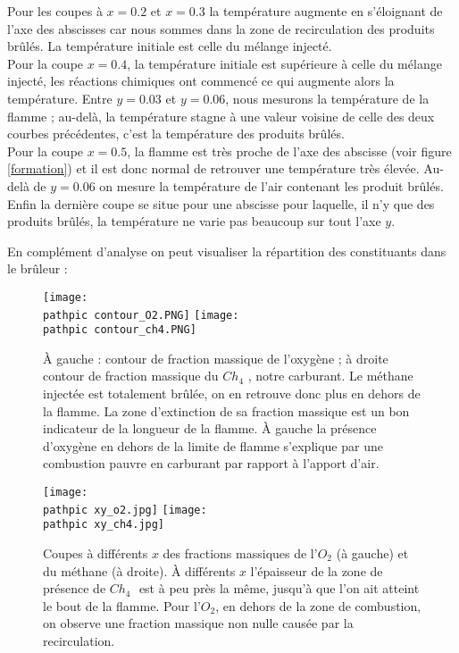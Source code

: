 \documentclass[a4paper,10pt]{article}
\newcommand\pathpic{/home/saura/Documents/Latex_files/Pic/BE_combustion/tp2/}
\newcommand{\chq}{$Ch_4$ }
\begin{document}
\noindent Pour les coupes à $x=0.2$ et $x=0.3$ la température augmente en s'éloignant de l'axe des abscisses car nous sommes dans la zone de recirculation des produits brûlés. La température initiale est celle du mélange injecté.\\
Pour la coupe $x=0.4$, la température initiale est supérieure à celle du mélange injecté, les réactions chimiques ont commencé ce qui augmente alors la température. Entre $y=0.03$ et $y=0.06$, nous mesurons la température de la flamme ; au-delà, la température stagne à une valeur voisine de celle des deux courbes précédentes, c'est la température des produits brûlés.\\
Pour la coupe $x=0.5$, la flamme est très proche de l'axe des abscisse (voir figure \ref{formation}) et il est donc normal de retrouver une température très élevée. Au-delà de $y = 0.06$ on mesure la température de l'air contenant les produit brûlés.\\
Enfin la dernière coupe se situe pour une abscisse pour laquelle, il n'y que des produits brûlés, la température ne varie pas beaucoup sur tout l'axe $y$.

\pagebreak 

\noindent En complément d'analyse on peut visualiser la répartition des constituants dans le brûleur :

\begin{figure}[ht!]
\centering
\texttt{[image: \\pathpic contour\_O2.PNG]} \hfill
\texttt{[image: \\pathpic contour\_ch4.PNG]}
\caption{À gauche : contour de fraction massique de l'oxygène ; à droite contour de fraction massique du \chq , notre carburant. Le méthane injectée est totalement brûlée, on en retrouve donc plus en dehors de la flamme. La zone d'extinction de sa fraction massique est un bon indicateur de la longueur de la flamme. À gauche la présence d'oxygène en dehors de la limite de flamme s'explique par une combustion pauvre en carburant par rapport à l'apport d'air.  }
\label{contour_reactif}
\end{figure}

\begin{figure}[ht!]
\centering
\texttt{[image: \\pathpic xy\_o2.jpg]} \hfill
\texttt{[image: \\pathpic xy\_ch4.jpg]}
\caption{Coupes à différents $x$ des fractions massiques de l'$O_2$ (à gauche) et du méthane (à droite). À différents $x$ l'épaisseur de la zone de présence de \chq $ $ est à peu près la même, jusqu'à que l'on ait atteint le bout de la flamme. Pour l'$O_2$, en dehors de la zone de combustion, on observe une fraction massique non nulle causée par la recirculation. }
\label{densite_o2_ch4}
\end{figure}
\end{document}

